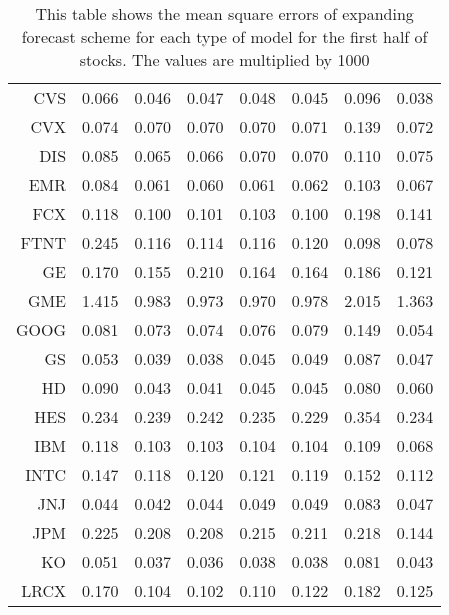 \begin{table}[ht]
\begin{tabular}{rrrrrrrr}
  CVS & 0.066 & 0.046 & 0.047 & 0.048 & 0.045 & 0.096 & 0.038 \\ 
  CVX & 0.074 & 0.070 & 0.070 & 0.070 & 0.071 & 0.139 & 0.072 \\ 
  DIS & 0.085 & 0.065 & 0.066 & 0.070 & 0.070 & 0.110 & 0.075 \\ 
  EMR & 0.084 & 0.061 & 0.060 & 0.061 & 0.062 & 0.103 & 0.067 \\ 
  FCX & 0.118 & 0.100 & 0.101 & 0.103 & 0.100 & 0.198 & 0.141 \\ 
  FTNT & 0.245 & 0.116 & 0.114 & 0.116 & 0.120 & 0.098 & 0.078 \\ 
  GE & 0.170 & 0.155 & 0.210 & 0.164 & 0.164 & 0.186 & 0.121 \\ 
  GME & 1.415 & 0.983 & 0.973 & 0.970 & 0.978 & 2.015 & 1.363 \\ 
  GOOG & 0.081 & 0.073 & 0.074 & 0.076 & 0.079 & 0.149 & 0.054 \\ 
  GS & 0.053 & 0.039 & 0.038 & 0.045 & 0.049 & 0.087 & 0.047 \\ 
  HD & 0.090 & 0.043 & 0.041 & 0.045 & 0.045 & 0.080 & 0.060 \\ 
  HES & 0.234 & 0.239 & 0.242 & 0.235 & 0.229 & 0.354 & 0.234 \\ 
  IBM & 0.118 & 0.103 & 0.103 & 0.104 & 0.104 & 0.109 & 0.068 \\ 
  INTC & 0.147 & 0.118 & 0.120 & 0.121 & 0.119 & 0.152 & 0.112 \\ 
  JNJ & 0.044 & 0.042 & 0.044 & 0.049 & 0.049 & 0.083 & 0.047 \\ 
  JPM & 0.225 & 0.208 & 0.208 & 0.215 & 0.211 & 0.218 & 0.144 \\ 
  KO & 0.051 & 0.037 & 0.036 & 0.038 & 0.038 & 0.081 & 0.043 \\ 
  LRCX & 0.170 & 0.104 & 0.102 & 0.110 & 0.122 & 0.182 & 0.125 \\ 
   \hline
\end{tabular}
\caption[MSE expanding forecast (1)]{This table shows the mean square errors of expanding forecast scheme for each type of model for the first half of stocks. 
                     The values are multiplied by 1000} 
\label{Table:MSE_e_1}
\end{table}
